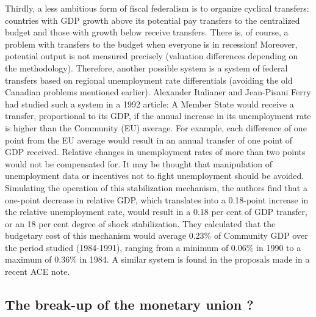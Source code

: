 \documentclass[12pt]{article}
\begin{document}
Thirdly, a less ambitious form of fiscal federalism is to organize cyclical transfers: countries with GDP growth above its potential pay transfers to the centralized budget and those with growth below receive transfers. There is, of course, a problem with transfers to the budget when everyone is in recession! Moreover, potential output is not measured precisely (valuation differences depending on the methodology). Therefore, another possible system is a system of federal transfers based on regional unemployment rate differentials (avoiding the old Canadian problems mentioned earlier). Alexander Italianer and Jean-Pisani Ferry had studied such a system in a 1992 article: A Member State would receive a transfer, proportional to its GDP, if the annual increase in its unemployment rate is higher than the Community (EU) average. For example, each difference of one point from the EU average would result in an annual transfer of one point of GDP received. Relative changes in unemployment rates of more than two points would not be compensated for. It may be thought that manipulation of unemployment data or incentives not to fight unemployment should be avoided. Simulating the operation of this stabilization mechanism, the authors find that a one-point decrease in relative GDP, which translates into a 0.18-point increase in the relative unemployment rate, would result in a 0.18 per cent of GDP transfer, or an 18 per cent degree of shock stabilization. They calculated that the budgetary cost of this mechanism would average 0.23\% of Community GDP over the period studied (1984-1991), ranging from a minimum of 0.06\% in 1990 to a maximum of 0.36\% in 1984. A similar system is found in the proposals made in a recent ACE note.

\subsection{The break-up of the monetary union ?}
\end{document}
